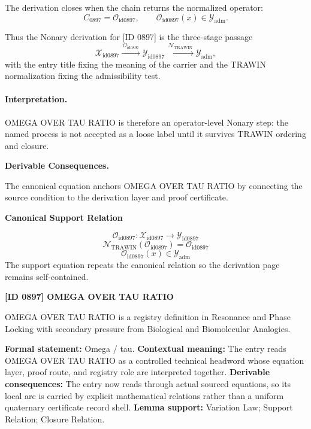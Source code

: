 The derivation closes when the chain returns the normalized operator:\[
C_{0897}=\mathcal{O}_{\mathrm{id0897}},\qquad \mathcal{O}_{\mathrm{id0897}}(x)\in\mathcal{Y}_{\mathrm{adm}}.
\]

Thus the Nonary derivation for [ID 0897] is the three-stage passage
\[
\mathcal{X}_{\mathrm{id0897}}\xrightarrow{\,\mathcal{O}_{\mathrm{id0897}}\,} \mathcal{Y}_{\mathrm{id0897}}\xrightarrow{\,\mathcal{N}_{\mathrm{TRAWIN}}\,} \mathcal{Y}_{\mathrm{adm}},
\]
with the entry title fixing the meaning of the carrier and the TRAWIN normalization fixing the admissibility test.

\paragraph{Interpretation.} OMEGA OVER TAU RATIO is therefore an operator-level Nonary step: the named process is not accepted as a loose label until it survives TRAWIN ordering and closure.

\par\vspace{0.35em}
\noindent\textbf{Derivable Consequences.}\quad
\begingroup
\footnotesize
\raggedright
The canonical equation anchors OMEGA OVER TAU RATIO by connecting the source condition to the derivation layer and proof certificate.
\par\endgroup

\noindent\textbf{Canonical Support Relation}\par
\[
\mathcal{O}_{\mathrm{id0897}}:\mathcal{X}_{\mathrm{id0897}}\longrightarrow\mathcal{Y}_{\mathrm{id0897}}
\]
\[
\mathcal{N}_{\mathrm{TRAWIN}}(\mathcal{O}_{\mathrm{id0897}})=\mathcal{O}_{\mathrm{id0897}}
\]
\[
\mathcal{O}_{\mathrm{id0897}}(x)\in\mathcal{Y}_{\mathrm{adm}}
\]
\noindent The support equation repeats the canonical relation so the derivation page remains self-contained.\par

\clearpage
\noindent\textbf{[ID 0897] OMEGA OVER TAU RATIO}\par
\vspace{0.35em}
\begingroup\small
{}
OMEGA OVER TAU RATIO is a registry definition in Resonance and Phase Locking with secondary pressure from Biological and Biomolecular Analogies.

\begingroup\footnotesize\setlength{\emergencystretch}{3em}\sloppy
\textbf{Formal statement:} Omega / tau. \textbf{Contextual meaning:} The entry reads OMEGA OVER TAU RATIO as a controlled technical headword whose equation layer, proof route, and registry role are interpreted together. \textbf{Derivable consequences:} The entry now reads through actual sourced equations, so its local arc is carried by explicit mathematical relations rather than a uniform quaternary certificate record shell. \textbf{Lemma support:} Variation Law; Support Relation; Closure Relation.\par
\endgroup

